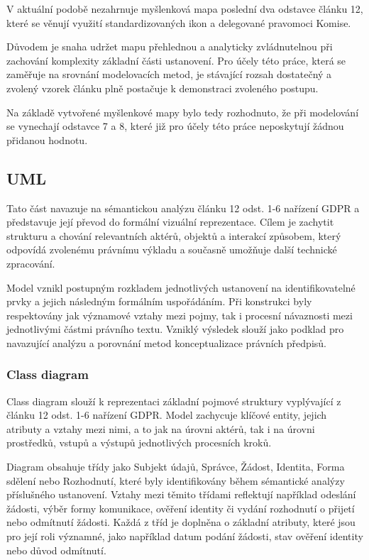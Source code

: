 \noindent V aktuální podobě nezahrnuje myšlenková mapa poslední dva odstavce článku 12, které se věnují využití standardizovaných ikon a delegované pravomoci Komise.

Důvodem je snaha udržet mapu přehlednou a analyticky zvládnutelnou při zachování komplexity základní části ustanovení. Pro účely této práce, která se zaměřuje na srovnání modelovacích metod, je stávající rozsah dostatečný a zvolený vzorek článku plně postačuje k demonstraci zvoleného postupu.

Na základě vytvořené myšlenkové mapy bylo tedy rozhodnuto, že při modelování se vynechají odstavce 7 a 8, které již pro účely této práce neposkytují žádnou přidanou hodnotu.


\subsection{UML}
\label{sec:uml}
Tato část navazuje na sémantickou analýzu článku 12 odst. 1-6 nařízení GDPR a představuje její převod do formální vizuální reprezentace. Cílem je zachytit strukturu a chování relevantních aktérů, objektů a interakcí způsobem, který odpovídá zvolenému právnímu výkladu a současně umožňuje další technické zpracování.

Model vznikl postupným rozkladem jednotlivých ustanovení na identifikovatelné prvky a jejich následným formálním uspořádáním. Při konstrukci byly respektovány jak významové vztahy mezi pojmy, tak i procesní návaznosti mezi jednotlivými částmi právního textu. Vzniklý výsledek slouží jako podklad pro navazující analýzu a porovnání metod konceptualizace právních předpisů.

\subsubsection{Class diagram}
\label{sec:uml-class-diagram}
Class diagram slouží k reprezentaci základní pojmové struktury vyplývající z článku 12 odst. 1-6 nařízení GDPR. Model zachycuje klíčové entity, jejich atributy a vztahy mezi nimi, a to jak na úrovni aktérů, tak i na úrovni prostředků, vstupů a výstupů jednotlivých procesních kroků.

Diagram obsahuje třídy jako Subjekt údajů, Správce, Žádost, Identita, Forma sdělení nebo Rozhodnutí, které byly identifikovány během sémantické analýzy příslušného ustanovení. Vztahy mezi těmito třídami reflektují například odeslání žádosti, výběr formy komunikace, ověření identity či vydání rozhodnutí o přijetí nebo odmítnutí žádosti. Každá z tříd je doplněna o základní atributy, které jsou pro její roli významné, jako například datum podání žádosti, stav ověření identity nebo důvod odmítnutí.

